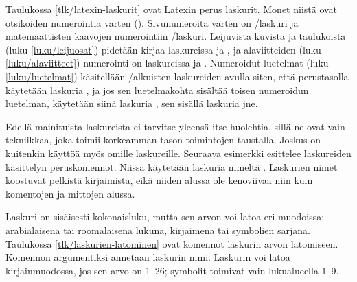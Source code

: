 Taulukossa \ref{tlk/latexin-laskurit} ovat Latexin perus laskurit. Monet
niistä ovat otsikoiden numerointia varten ().
Sivunumeroita varten on \-/laskuri ja matemaattisten
kaavojen numerointiin \-/laskuri. Leijuvista kuvista
ja taulukoista (luku \ref{luku/leijuosat}) pidetään kirjaa laskureissa
 ja , ja alaviitteiden (luku
\ref{luku/alaviitteet}) numerointi on laskureissa  ja
. Numeroidut luetelmat (luku \ref{luku/luetelmat})
käsitellään \-/alkuisten laskureiden avulla siten, että
perustasolla käytetään laskuria , ja jos sen
luetelmakohta sisältää toisen numeroidun luetelman, käytetään siinä
laskuria , sen sisällä laskuria  jne.

Edellä mainituista laskureista ei tarvitse yleensä itse huolehtia, sillä
ne ovat vain tekniikkaa, joka toimii korkeamman tason toimintojen
taustalla. Joskus on kuitenkin käyttöä myös omille laskureille. Seuraava
esimerkki esittelee laskureiden käsittelyn peruskomennot. Niissä
käytetään laskuria nimeltä . Laskurien nimet koostuvat
pelkistä kirjaimista, eikä niiden alussa ole kenoviivaa niin kuin
komentojen ja mittojen alussa.

\begin{koodilohkosis}
\setcounter{oma}{3}    %
\addtocounter{oma}{1}  %
\addtocounter{oma}{-1} %
\end{koodilohkosis}

\noindent
Laskuri on sisäisesti kokonaisluku, mutta sen arvon voi latoa eri
muodoissa: arabialaisena tai roomalaisena lukuna, kirjaimena tai
symbolien sarjana. Taulukossa \ref{tlk/laskurien-latominen} ovat komennot
laskurin arvon latomiseen. Komennon argumentiksi annetaan laskurin nimi.
Laskurin voi latoa kirjainmuodossa, jos sen arvo on 1--26; symbolit
toimivat vain lukualueella 1--9.



